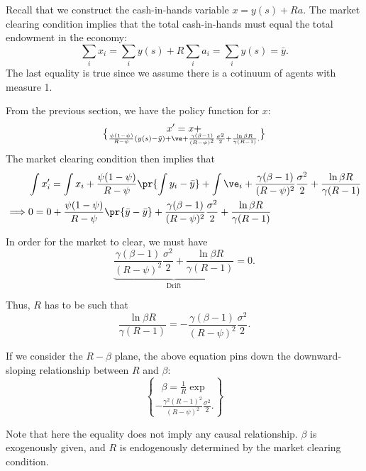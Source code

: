 Recall that we construct the cash-in-hands variable $x = y(s) + Ra$. The market clearing condition implies that the total cash-in-hands must equal the total endowment in the economy:
\[\sum_i x_i = \sum_i y(s) + R\sum_i a_i = \sum_i y(s) = \bar y.
\]
The last equality is true since we assume there is a cotinuum of agents with measure 1.

From the previous section, we have the policy function for $x$:
\[x' = x + \brace{\frac{\psi(1-\psi)}{R-\psi}(y(s)-\bar y)+\ve} +\frac{\gamma(\beta-1)}{(R-\psi)^2}\frac{\sigma^2}{2}+\frac{\ln \beta R}{\gamma (R-1)}.
\]
The market clearing condition then implies that
\[
\begin{aligned}
    & \int x_i' = \int x_i + \frac{\psi(1-\psi)}{R-\psi}\pr{\int y_i-\bar y}+\int \ve_i+ \frac{\gamma(\beta-1)}{(R-\psi)^2}\frac{\sigma^2}{2}+\frac{\ln \beta R}{\gamma (R-1)}\\
    \implies & 0 = 0+\frac{\psi(1-\psi)}{R-\psi}\pr{\bar y-\bar y}+\frac{\gamma(\beta-1)}{(R-\psi)^2}\frac{\sigma^2}{2}+\frac{\ln \beta R}{\gamma (R-1)}
\end{aligned}
\]

In order for the market to clear, we must have
\[
\underbrace{\frac{\gamma(\beta-1)}{(R-\psi)^2}\frac{\sigma^2}{2}+\frac{\ln \beta R}{\gamma (R-1)}}_{\text{Drift}} = 0.
\]

Thus, $R$ has to be such that
\[
\frac{\ln \beta R}{\gamma (R-1)} = - \frac{\gamma(\beta-1)}{(R-\psi)^2}\frac{\sigma^2}{2}.
\]

If we consider the $R-\beta$ plane, the above equation pins down the downward-sloping relationship between $R$ and $\beta$:
\[
\beta = \frac{1}{R}\exp\brace{-\frac{\gamma^2(R-1)^2}{(R-\psi)^2}\frac{\sigma^2}{2}}.
\]

Note that here the equality does not imply any causal relationship. $\beta$ is exogenously given, and $R$ is endogenously determined by the market clearing condition.

\begin{center}
\end{center}

